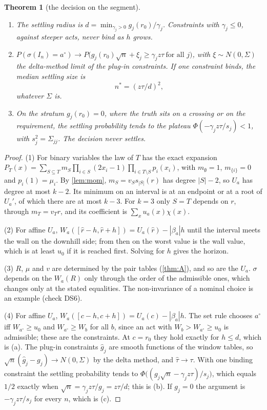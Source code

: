 \documentclass[11pt]{article}
\newtheorem{theorem}{Theorem}\renewcommand{\thetheorem}{\Alph{theorem}}
\theoremstyle{definition}\newtheorem{definition}{Definition}\newtheorem{remark}{Remark}
\begin{document}
\begin{theorem}[the decision on the segment]
\begin{enumerate}
\begin{enumerate}
\item[(a)] The \emph{settling radius} is $d=\min_{\gamma_j>0}g_j(r_0)/\gamma_j$. Constraints with $\gamma_j\le0$, against steeper acts,
never bind as $h$ grows.
\item[(b)] $P(\sigma(I_n)=a^\circ)\to P\bigl(g_j(r_0)\sqrt n+\xi_j\ge\gamma_jz\tau\ \text{for all }j\bigr)$, with $\xi\sim N(0,\Sigma)$ the
delta-method limit of the plug-in constraints. If one constraint binds, the median settling size is
\[n^*=(z\tau/d)^2,\]
whatever $\Sigma$ is.
\item[(c)] On the stratum $g_j(r_0)=0$, where the truth sits on a crossing or on the requirement, the settling probability tends to
the plateau $\Phi(-\gamma_jz\tau/s_j)<1$, with $s_j^2=\Sigma_{jj}$. The decision never settles.
\end{enumerate}
\end{enumerate}
\end{theorem}

\begin{proof}
(1) For binary variables the law of $T$ has the exact expansion
$P_T(x)=\sum_{S\subseteq T}m_S\prod_{i\in S}(2x_i-1)\prod_{i\in T\setminus S}p_i(x_i)$, with $m_\emptyset=1$, $m_{\{i\}}=0$ and
$p_i(1)=\mu_i$. By \cref{lem:mom}, $m_S=v_Ss_{|S|}(r)$ has degree $|S|-2$, so $U_a$ has degree at most $k-2$. Its minimum on an interval
is at an endpoint or at a root of $U_a'$, of which there are at most $k-3$. For $k=3$ only $S=T$ depends on $r$, through $m_T=v_Tr$, and
its coefficient is $\sum_xu_a(x)\chi(x)$.

(2) For affine $U_a$, $W_a([\hat r-h,\hat r+h])=U_a(\hat r)-|\beta_a|h$ until the interval meets the wall on the downhill side; from then
on the worst value is the wall value, which is at least $u_0$ if it is reached first. Solving for $h$ gives the horizon.

(3) $R$, $\mu$ and $v$ are determined by the pair tables (\cref{thm:A}), and so are the $U_a$. $\sigma$ depends on the $W_a(R)$ only
through the order of the admissible ones, which changes only at the stated equalities. The non-invariance of a nominal choice is an
example (check DS6).

(4) For affine $U_a$, $W_a([c-h,c+h])=U_a(c)-|\beta_a|h$. The set rule chooses $a^\circ$ iff $W_{a^\circ}\ge u_0$ and
$W_{a^\circ}\ge W_b$ for all $b$, since an act with $W_b>W_{a^\circ}\ge u_0$ is admissible; these are the constraints. At $c=r_0$ they
hold exactly for $h\le d$, which is (a). The plug-in constraints $\hat g_j$ are smooth functions of the window tables, so
$\sqrt n(\hat g_j-g_j)\to N(0,\Sigma)$ by the delta method, and $\hat\tau\to\tau$. With one binding constraint the settling probability
tends to $\Phi\bigl((g_j\sqrt n-\gamma_jz\tau)/s_j\bigr)$, which equals $1/2$ exactly when $\sqrt n=\gamma_jz\tau/g_j=z\tau/d$; this is
(b). If $g_j=0$ the argument is $-\gamma_jz\tau/s_j$ for every $n$, which is (c).
\end{proof}
\end{document}
